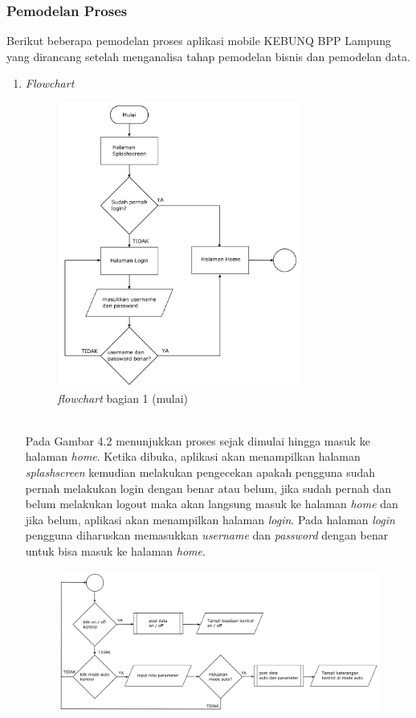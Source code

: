 \begin{flushleft}
\begin{justify}
        \subsubsection{Pemodelan Proses}
        Berikut beberapa pemodelan proses aplikasi mobile KEBUNQ BPP Lampung yang dirancang setelah menganalisa tahap pemodelan bisnis dan 
            pemodelan data.
        \begin{enumerate}[label=\alph*.]
            \item \emph{Flowchart}\\
            \begin{figure}[ht]
                \centering
                \includegraphics[width=8cm]{images/bab 4/fc 1.png}
                \caption{\textit{flowchart} bagian 1 (mulai)}
            \end{figure}
            \\Pada Gambar 4.2 menunjukkan proses  sejak dimulai hingga masuk ke halaman \emph{home}. Ketika dibuka, aplikasi akan menampilkan halaman \emph{splashscreen} kemudian melakukan pengecekan apakah pengguna sudah pernah
            melakukan login dengan benar atau belum, jika sudah pernah dan belum melakukan logout maka akan langsung masuk ke halaman \emph{home} dan jika belum, aplikasi akan menampilkan halaman \emph{login}. Pada halaman \emph{login} pengguna diharuskan memasukkan \emph{username} dan \emph{password} dengan benar untuk bisa masuk ke halaman \emph{home}.
            \vspace{8cm}
            \begin{figure}[ht]
                \centering
                \includegraphics[width=12cm]{images/bab 4/fc-kontrol.png}

\end{figure}
\end{enumerate}
\end{justify}
\end{flushleft}

